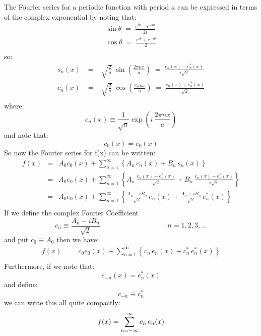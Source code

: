 \documentclass[12pt]{book}
\begin{document}
The Fourier series for a periodic function with period $a$ can be expressed in terms of the complex exponential by noting that:
\begin{eqnarray*}
\sin\theta \; = \; \frac{e^{i \theta} - e^{-i \theta}}{2i} \\[5pt]
\cos\theta \; = \; \frac{e^{i \theta} + e^{-i \theta}}{2} \\
\end{eqnarray*}
so:
\begin{eqnarray*}
s_n(x) \; &=& \; \sqrt{\frac{2}{a}} \; \sin\left(\frac{2\pi n x}{a}\right) \; = \; \frac{e_n(x) - e_n^*(x)}{i \sqrt{2}}\\[8pt]
c_n(x) \; &=& \; \sqrt{\frac{2}{a}} \; \cos\left(\frac{2\pi n x}{a}\right) \; = \; \frac{e_n(x) + e_n^*(x)}{\sqrt{2}}\\
\end{eqnarray*}
where:
\begin{equation}
e_n(x) \equiv \frac{1}{\sqrt{a}}\exp\left( i \, \frac{2 \pi n x}{a}\right)
\end{equation}
and note that:
$$c_0(x) = e_0(x)$$
So now the Fourier series for f(x) can be written:
\begin{eqnarray*}
f(x) &=& A_0 c_0(x) + \sum_{n=1}^{\infty}  \left\{ A_n \, c_n( x ) + B_n \, s_n( x ) \right\} \\
&=& A_0 e_0(x) + \sum_{n=1}^{\infty}  \left\{ A_n \,  \frac{e_n(x) + e_n^*(x)}{\sqrt{2}}
+ B_n \,  \frac{e_n(x) - e_n^*(x)}{i\sqrt{2}} \right\} \\
&=& A_0 e_0(x) + \sum_{n=1}^{\infty}  \left\{ \frac{A_n - i B_n}{\sqrt{2}}\, e_n(x) + 
\frac{A_n + i B_n}{\sqrt{2}}\, e_n^*(x)\right\} \\
\end{eqnarray*}
If we define the complex Fourier Coefficient
$$c_n \equiv \frac{A_n-iB_n}{\sqrt{2}}  \hspace{4cm} n=1,2,3,\ldots$$
and put $c_0 \equiv A_0$ then we have:
\begin{eqnarray*}
f(x) &=& c_0 e_0(x) + \sum_{n=1}^{\infty}  \left\{ c_n \, e_n(x) + c_n^* \, e_n^*(x) \right\} \\
\end{eqnarray*}
Furthermore, if we note that:
$$e_{-n}(x) = e_{n}^*(x)$$
and define:
\begin{equation}
\label{eqn:cofreal}
c_{-n} \equiv c_n^*
\end{equation}
we can write this all quite compactly:
\begin{equation*}
f(x) = \sum_{n=-\infty}^{\infty}  c_n \, e_n(x)  \\
\end{equation*}
\end{document}
